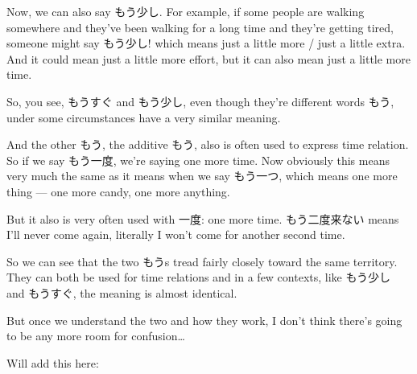 {}

Now, we can also say もう少し. For example, if some people are walking somewhere and they've been walking for a long time and they're getting tired, someone might say もう少し! which means just a little more / just a little extra. And it could mean just a little more effort, but it can also mean just a little more time.

{}

So, you see, もうすぐ and もう少し, even though they're different words もう, under some circumstances have a very similar meaning.

And the other もう, the additive もう, also is often used to express time relation. So if we say もう一度, we're saying one more time. Now obviously this means very much the same as it means when we say もう一つ, which means one more thing --- one more candy, one more anything.

But it also is very often used with 一度: one more time. もう二度来ない means I'll never come again, literally I won't come for another second time.

{}

So we can see that the two もうs tread fairly closely toward the same territory. They can both be used for time relations and in a few contexts, like もう少し and もうすぐ, the meaning is almost identical.

But once we understand the two and how they work, I don't think there's going to be any more room for confusion\ldots{}

{}

Will add this here:

{}

{}

\stopsectionlevel

\stopsectionlevel

\stopsectionlevel
